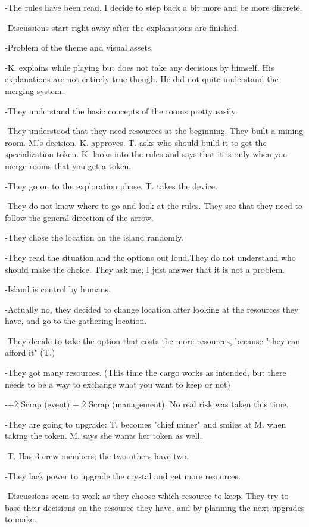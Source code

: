 \documentclass[a4paper,11pt]{report}
\begin{document}
-The rules have been read. I decide to step back a bit more and be more discrete.

-Discussions start right away after the explanations are finished.

-Problem of the theme and visual assets. 

-K. explains while playing but does not take any decisions by himself. His explanations are not entirely true though. He did not quite understand the merging system.

-They understand the basic concepts of the rooms pretty easily.

-They understood that they need resources at the beginning. They built a mining room. M.'s decision. K. approves. T. asks who should build it to get the specialization token. K. looks into the rules and says that it is only when you merge rooms that you get a token.

-They go on to the exploration phase. T. takes the device.

-They do not know where to go and look at the rules. They see that they need to follow the general direction of the arrow.

-They chose the location on the island randomly.

-They read the situation and the options out loud.They do not understand who should make the choice. They ask me, I just answer that it is not a problem. 

-Island is control by humans.

-Actually no, they decided to change location after looking at the resources they have, and go to the gathering location.

-They decide to take the option that costs the more resources, because "they can afford it" (T.)

-They got many resources. (This time the cargo works as intended, but there needs to be a way to exchange what you want to keep or not)

-+2 Scrap (event) + 2 Scrap (management). No real risk was taken this time.

-They are going to upgrade: T. becomes "chief miner" and smiles at M. when taking the token. M. says she wants her token as well.

-T. Has 3 crew members; the two others have two.

-They lack power to upgrade the crystal and get more resources.

-Discussions seem to work as they choose which resource to keep. They try to base their decisions on the resource they have, and by planning the next upgrades to make.
\end{document}
